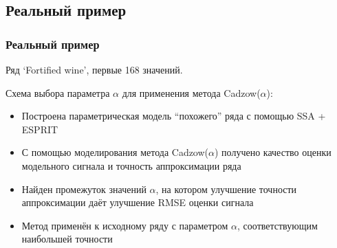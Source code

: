 \documentclass[unicode, notheorems]{beamer}
\begin{document}
\subsection{Реальный пример}
\begin{frame}
	\frametitle{Реальный пример}
    Ряд `Fortified wine', первые 168 значений.
    
    Схема выбора параметра $\alpha$ для применения метода Cadzow($\alpha$):
    \begin{itemize}
    	\item Построена параметрическая модель ``похожего'' ряда с помощью SSA + ESPRIT
    	\item С помощью моделирования метода Cadzow($\alpha$) получено качество оценки модельного сигнала и точность аппроксимации ряда
    	\item Найден промежуток значений $\alpha$, на котором улучшение точности аппроксимации даёт улучшение RMSE оценки сигнала
    	\item Метод применён к исходному ряду с параметром $\alpha$, соответствующим наибольшей точности
    \end{itemize}
\end{frame}

%	
\end{document}
